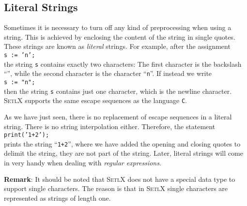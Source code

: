 \subsection{Literal Strings}
Sometimes it is necessary to turn off any kind of preprocessing when using a string.  This
is achieved by enclosing the content of the string in single quotes.  These strings are
known as \emph{literal} strings.  For example, after
the assignment
\\[0.2cm]
\hspace*{1.3cm}
\texttt{s := 'n';}
\\[0.2cm]
the string \texttt{s} contains exactly two characters:  The first character is the
backslash ``\texttt{}'', while the second character is the character ``\texttt{n}''.
If  instead we write
\\[0.2cm]
\hspace*{1.3cm}
\texttt{s := "n";}
\\[0.2cm]
then the string \texttt{s} contains just one character, which is the newline character.
\textsc{SetlX} supports the same escape sequences as the language \texttt{C}.

As we have just seen, there is no replacement of escape sequences in a literal string.
There is no string interpolation either.  Therefore, the statement
\\[0.2cm]
\hspace*{1.3cm}
\texttt{print('1+2');}
\\[0.2cm]
prints the string ``\texttt{1+2}'', where we have added the opening
and closing quotes to delimit the string, they are not part of the string.
Later, literal strings will come in very handy when dealing with \emph{regular expressions}.

\noindent
\textbf{Remark}:
It should be noted that \textsc{SetlX} does not have a special data type to support single characters.
The reason is that in \textsc{SetlX} single characters are represented as strings of length one. 

